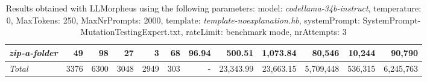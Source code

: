 \begin{table*}
{\begin{tabular}{l||r|r|r|r|r|r||r|r||r|r|r}
   \hline
   \textit{zip-a-folder} & 49 & 98 & 27 & 3 & 68 & 96.94 & 500.51 & 1,073.84 & 80,546 & 10,244 & 90,790 \\ 
   \hline
   \textit{Total} & 3376 & 6300 & 3048 & 2949 & 303 & - & 23,343.99  & 23,663.15 & 5,709,448 & 536,315 & 6,245,763 \\ 
 \end{tabular}
 }
 \caption{Results obtained with LLMorpheus using the following parameters: 
   model: \textit{codellama-34b-instruct}, 
   temperature: 0, 
   MaxTokens: 250, 
   MaxNrPrompts: 2000, 
   template: \textit{template-noexplanation.hb}, 
   systemPrompt: SystemPrompt-MutationTestingExpert.txt, 
   rateLimit: benchmark mode, 
   nrAttempts: 3  
 }
\end{table*}

